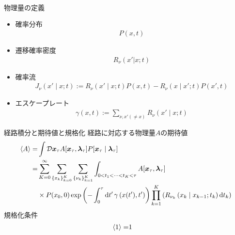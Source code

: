 \documentclass{beamer}
\begin{document}
\begin{frame}{物理量の定義}
    \begin{itemize}
        \item 確率分布
        \begin{align}
            P(x,t)
        \end{align}
        \item 遷移確率密度
        \begin{align}
            R_\nu(x'|x;t)
        \end{align}
        \item 確率流
        \begin{align}
            J_\nu(x'\mid x;t):=R_\nu(x'\mid x;t)P(x,t)-R_\nu(x\mid x';t)P(x',t)
        \end{align}
        \item エスケープレート
        \begin{align}
            \gamma(x,t):=\sum_{\nu,x'(\neq x)}R_\nu(x'\mid x;t)
        \end{align}
    \end{itemize}
\end{frame}

\begin{frame}[fragile]{経路積分と期待値と規格化}
経路に対応する物理量$A$の期待値
\begin{align*}
    \ev{A}=&\int\mathcal{D}\bm{x}_\tau A[\bm{x}_\tau,\bm{\lambda}_\tau]P[\bm{x}_\tau\mid\bm{\lambda}_\tau]\\
    =&\sum_{K=0}^{\infty}\sum_{\lbrace x_k\rbrace_{k=0}^K}\sum_{\lbrace\nu_k\rbrace_{k=1}^K}\int_{0<t_1<\cdots<t_K<\tau}A[\bm{x}_\tau,\bm{\lambda}_\tau]\\
    &\times P(x_0,0)\exp\left(-\int_0^\tau \dd{t'}\gamma\left(x(t'),t'\right)\right)\prod_{k=1}^K \left(R_{\nu_k}\left(x_k\mid x_{k-1};t_k\right)\dd{t_k}\right)
\end{align*}
規格化条件
\begin{align}
    \ev{1}=&1
\end{align}
\end{frame}
\end{document}
